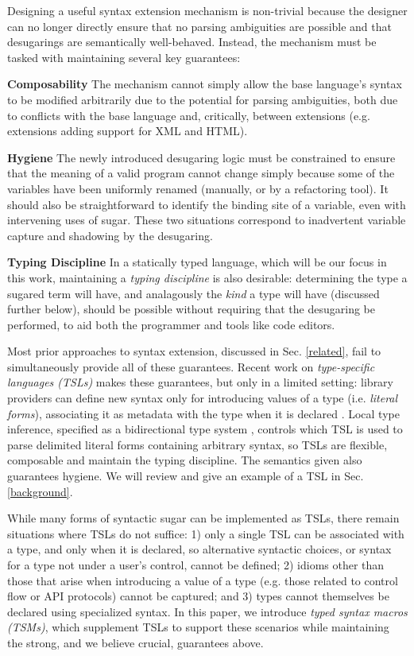 \documentclass{sig-alternate}
\begin{document}
Designing a useful syntax extension mechanism is non-trivial because the designer can no longer  directly ensure that no parsing ambiguities are possible and that desugarings are semantically well-behaved. Instead, the mechanism must be tasked with maintaining several key guarantees:


\textbf{Composability} The mechanism cannot simply allow the base language's syntax to  be modified arbitrarily due to the potential for parsing ambiguities, both due to conflicts with the base language and, critically, between extensions (e.g. extensions adding support for XML and HTML).%


\textbf{Hygiene} The newly introduced desugaring logic must be constrained to ensure that the meaning of a valid program cannot change simply because some of the variables have been uniformly renamed (manually, or by a refactoring tool). It should also be straightforward to identify the binding site of a variable, even with intervening uses of sugar. These two situations correspond to inadvertent variable capture and shadowing by the desugaring. 


\textbf{Typing Discipline} In a statically typed language, which will be our focus in this work, maintaining a \emph{typing discipline} is also desirable: determining the type a sugared term will have, and analagously the \emph{kind} a type will have (discussed further below), should be possible without requiring that the desugaring be performed, to aid both the programmer and tools like code editors. 

Most prior approaches to syntax extension, discussed in Sec. \ref{related}, fail to simultaneously provide all of these guarantees. Recent work on \emph{type-specific languages  (TSLs)} makes these guarantees, but only in a limited setting: library providers can define new syntax only for introducing values of a type (i.e. \emph{literal forms}), associating it as metadata with the type when it is declared \cite{TSLs}. Local type inference, specified as a bidirectional type system \cite{Pierce:2000:LTI:345099.345100}, controls which TSL is used to parse delimited literal forms containing arbitrary syntax, so TSLs are flexible, composable and maintain the typing discipline. The semantics given also guarantees hygiene. We will review and give an example of a TSL in Sec. \ref{background}. 

While many forms of syntactic sugar can be implemented as TSLs, there remain situations where TSLs do not suffice: 1) only a single TSL can be associated with a type, and only when it is declared, so alternative syntactic choices, or syntax for a type not under a user's control, cannot be defined; 2) idioms other than those that arise when introducing a value of a type (e.g. those related to control flow or API protocols) cannot be captured; and 3) types cannot themselves be declared using specialized syntax. In this paper, we introduce \emph{typed syntax macros (TSMs)}, which supplement TSLs to support these scenarios while maintaining the strong, and we believe crucial, guarantees above.%
\end{document}
